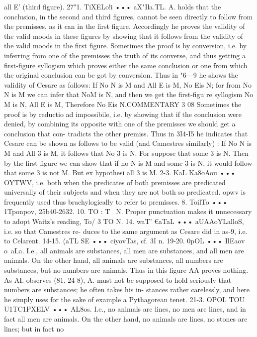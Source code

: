 {all E' (third figure).
27"1. TiXELo!i ••• aX"Ila.TL. A. holds that the conclusion, in
the second and third figures, cannot be seen directly to follow
from the premisses, as it can in the first figure. Accordingly he
proves the validity of the valid moods in these figures by showing
that it follows from the validity of the valid moods in the first
figure. Sometimes the proof is by conversion, i.e. by inferring
from one of the premisses the truth of its converse, and thus
getting a first-figure syllogism which proves either the same
conclusion or one from which the original conclusion can be got
by conversion. Thus in "6---9 he shows the validity of Cesare as
follows: If No N is M and All E is M, No Eis N; for from No N
is M we can infer that NoM is N, and then we get the first-figu re
syllogism No M is N, All E is M, Therefore No Eis N.COMMENTARY
3 08
Sometimes the proof is by reductio ad impossibile, i.e. by showing
that if the conclusion were denied, by combining its opposite
with one of the premisses we should get a conclusion that con-
tradicts the other premiss. Thus in 3I4-I5 he indicates that
Cesare can be shown as follows to be valid (and Camestres
similarly) : If No N is M and All 3 is M, it follows that No 3 is N.
For suppose that some 3 is N. Then by the first figure we can
show that if no N is M and some 3 is N, it would follow that some
3 is not M. But ex hypothesi all 3 is M.
2-3. KaL Ka8oAou ••• OYTWV, i.e. both when the predicates of
both premisses are predicated universally of their subjects and
when they are not both so predicated. opwv is frequently used
thus brachylogically to refer to premisses.
8. ToilTo ••• 1Tponpov, 25b40-2632.
10. TO : T~ N. Proper punctuation makes it unnecessary to
adopt Waitz's reading, To/ 3 TO N.
14. waT' €aTaL ••• aUAAoYLalloS, i.e. so that Camestres re-
duces to the same argument as Cesare did in as-9, i.e. to Celarent.
14-15. (aTL SE ••• ciyovTas, cf. 3I n.
19-20. 0pOL ••• IlEaov o~aLa. I.e., all animals are substances, all
men are substances, and all men are animals. On the other hand,
all animals are substances, all numbers are substances, but no
numbers are animals. Thus in this figure AA proves nothing.
As AI. observes (81. 24-8), A. must not be supposed to hold
seriously that numbers are substances; he often takes his in-
stances rather carelessly, and here he simply uses for the sake of
example a Pythagorean tenet.
21-3. OPOL TOU U1TC1PXELV ••• AL8os. I.e., no animals are lines,
no men are lines, and in fact all men are animals. On the other
hand, no animals are lines, no stones are lines; but in fact no
}
